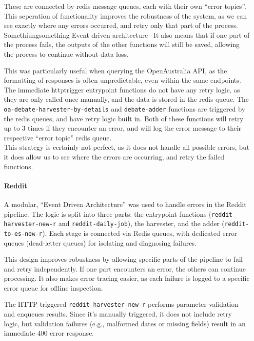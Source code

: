 \documentclass[]{article}
\numberwithin{equation}{section}
\begin{document}
These are connected by redis message queues, each with their own ``error topics''.
This seperation of functionality improves the robustness of the system, as we can see exactly where any errors occurred, and retry only that part of the process. Somethiungsomething Event driven architecture
\
It also means that if one part of the process fails, the outputs of the other functions will still be saved, allowing the process to continue without data loss.

This was particularly useful when querying the OpenAustralia API, as the formatting of responses is often unpredictable, even within the same endpoints.
\\
The immediate httptrigger entrypoint functions do not have any retry logic, as they are only called once manually, and the data is stored in the redis queue.
The \texttt{oa-debate-harvester-by-details} and \texttt{debate-adder} functions are triggered by the redis queues, and have retry logic built in. 
Both of these functions will retry up to 3 times if they encounter an error, and will log the error message to their respective ``error topic'' redis queue.
\\
This strategy is certainly not perfect, as it does not handle all possible errors, but it does allow us to see where the errors are occurring, and retry the failed functions.

\paragraph*{Reddit} 
A modular, “Event Driven Architecture” was used to handle errors in the Reddit pipeline. The logic is split into three parts: the entrypoint functions (\texttt{reddit-harvester-new-r} and \texttt{reddit-daily-job}), the harvester, and the adder (\texttt{reddit-to-es-new-r}). Each stage is connected via Redis queues, with dedicated error queues (dead-letter queues) for isolating and diagnosing failures.

This design improves robustness by allowing specific parts of the pipeline to fail and retry independently. If one part encounters an error, the others can continue processing. It also makes error tracing easier, as each failure is logged to a specific error queue for offline inspection.

The HTTP-triggered \texttt{reddit-harvester-new-r} performs parameter validation and enqueues results. Since it’s manually triggered, it does not include retry logic, but validation failures (e.g., malformed dates or missing fields) result in an immediate 400 error response.
\end{document}
